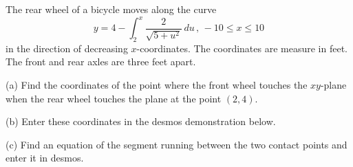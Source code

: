 \documentclass{ximera}
\begin{document}
\begin{question} \label{Q5704r:Vectors}
The rear wheel of a bicycle moves along the curve
\[
    y = 4 -\int_2^x \frac{2}{\sqrt{5+u^2}}\, du \, , \, -10 \leq x \leq 10 
\]
in the direction of decreasing $x$-coordinates. The coordinates are measure in feet. The front and rear axles are three feet apart.

(a) Find the coordinates of the point where the front wheel touches the $xy$-plane when the rear wheel touches the plane at the point $(2,4)$. 

(b) Enter these coordinates in the desmos demonstration below. 

(c) Find an equation of the segment running between the two contact points and enter it in desmos.

 
\begin{onlineOnly}
    \begin{center}
\end{center}
\end{onlineOnly}

\end{question}
\end{document}
